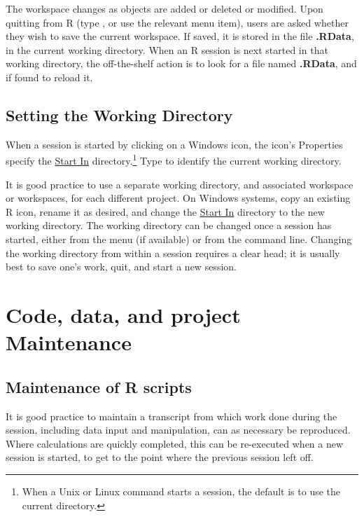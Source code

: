 The workspace changes as objects are added or deleted or modified.
Upon quitting from R (type , or use the relevant menu item),
users are asked whether they wish to save the current workspace.
If saved, it is stored in the file \textbf{.RData}, in the current
working directory.  When an R session is next started in that
working directory, the off-the-shelf action is to look for a file
named \textbf{.RData}, and if found to reload it.

\subsection*{Setting the Working Directory}
When a session is started by clicking on a Windows icon, the icon's
Properties specify the \underline{Start In} directory.\footnote{When a
  Unix or Linux command starts a session, the default is to use the
  current directory.} Type  to identify the current
working directory.

It is good practice to use a separate working directory, and
associated workspace or workspaces, for each different project. On
Windows systems, copy an existing R icon, rename it as desired, and
change the \underline{Start In} directory to the new working
directory.  The working directory can be changed once a session has started, either from the
menu (if available) or from the command line.  Changing the working
directory from within a session requires a clear head; it is usually
best to save one's work, quit, and start a new session.

\section{Code, data, and project Maintenance}

\subsection{Maintenance of R scripts}

  It is good practice to maintain a transcript
from which work done during the session, including data input and
manipulation, can as necessary be reproduced.  Where calculations are
quickly completed, this can be re-executed when a new session is
started, to get to the point where the previous session left off.

